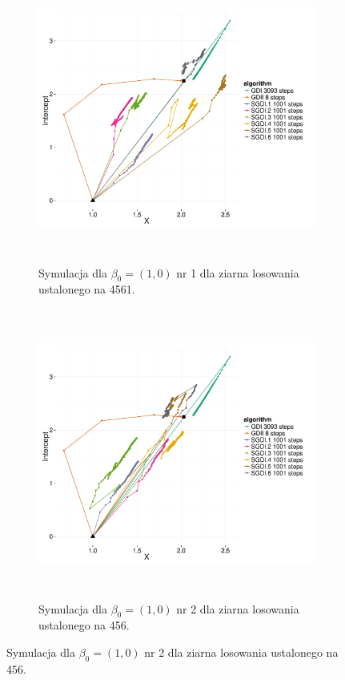 \begin{figure}[hbt!]
  \begin{center}
   \begin{subfigure}[h!]{0.9\textwidth}
      \includegraphics[width=\textwidth, height=270pt]{Obrazki/sgd_1_0_1.pdf}
      \caption{Symulacja dla $\beta_0 = (1,0)$ nr 1 dla ziarna losowania ustalonego na 4561.}
   \end{subfigure}     
   \begin{subfigure}[h!]{0.9\textwidth}
      \includegraphics[width=\textwidth, height=270pt]{Obrazki/sgd_1_0_2.pdf}
      \caption{Symulacja dla $\beta_0 = (1,0)$ nr 2 dla ziarna losowania ustalonego na 456.}
   \end{subfigure}  \end{center}

\end{figure}
